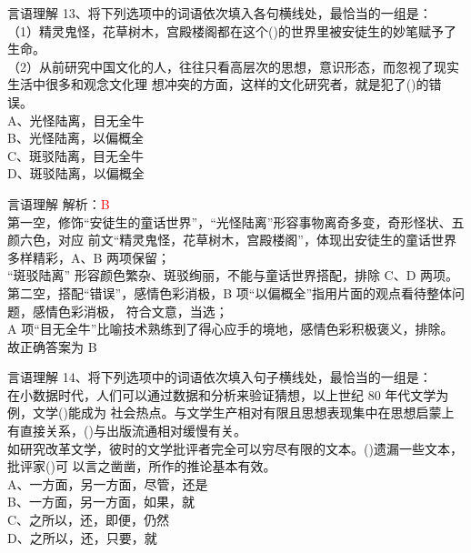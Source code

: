 \documentclass[aspectratio=169]{beamer}
\begin{document}
\begin{frame}[t]{言语理解}
    13、将下列选项中的词语依次填入各句横线处，最恰当的一组是：\\
    （1）精灵鬼怪，花草树木，宫殿楼阁都在这个()的世界里被安徒生的妙笔赋予了生命。\\
    （2）从前研究中国文化的人，往往只看高层次的思想，意识形态，而忽视了现实生活中很多和观念文化理
    想冲突的方面，这样的文化研究者，就是犯了()的错误。\\
    A、光怪陆离，目无全牛\\
    B、光怪陆离，以偏概全\\
    C、斑驳陆离，目无全牛\\
    D、斑驳陆离，以偏概全\\
\end{frame}



\begin{frame}[t]{言语理解}
    解析：\textcolor{red}{B}\\
    第一空，修饰“安徒生的童话世界”，“光怪陆离”形容事物离奇多变，奇形怪状、五颜六色，对应
    前文“精灵鬼怪，花草树木，宫殿楼阁”，体现出安徒生的童话世界多样精彩，A、B 两项保留；\\
    “斑驳陆离”
    形容颜色繁杂、斑驳绚丽，不能与童话世界搭配，排除 C、D 两项。\\

    第二空，搭配“错误”，感情色彩消极，B 项“以偏概全”指用片面的观点看待整体问题，感情色彩消极，
    符合文意，当选；\\
    A 项“目无全牛”比喻技术熟练到了得心应手的境地，感情色彩积极褒义，排除。
    故正确答案为 B
\end{frame}



\begin{frame}[t]{言语理解}
    14、将下列选项中的词语依次填入句子横线处，最恰当的一组是：\\
    在小数据时代，人们可以通过数据和分析来验证猜想，以上世纪 80 年代文学为例，文学()能成为
    社会热点。与文学生产相对有限且思想表现集中在思想启蒙上有直接关系，()与出版流通相对缓慢有关。\\
    如研究改革文学，彼时的文学批评者完全可以穷尽有限的文本。()遗漏一些文本，批评家()可
    以言之凿凿，所作的推论基本有效。\\
    A、一方面，另一方面，尽管，还是\\
    B、一方面，另一方面，如果，就\\
    C、之所以，还，即便，仍然\\
    D、之所以，还，只要，就\\
\end{frame}
\end{document}
